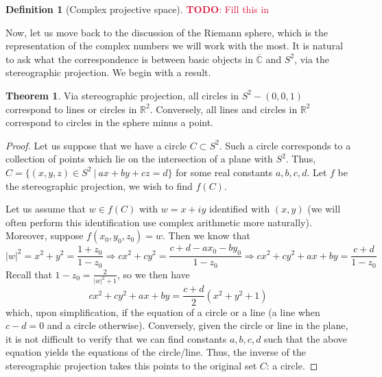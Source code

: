 \documentclass[aps,pra,showpacs,notitlepage,onecolumn,superscriptaddress,nofootinbib]{revtex4-1}
\newcommand{\pop}[1]{\textcolor{crimson}{#1}}
\theoremstyle{definition}
\newtheorem{definition}{Definition}[section]
\newtheorem{theorem}{Theorem}[section]
\begin{document}
\begin{definition}[Complex projective space]
  \pop{\textbf{TODO}: Fill this in}
\end{definition}

\noindent Now, let us move back to the discussion of the Riemann sphere, which is the representation of the complex numbers we will work with the most. It is natural
to ask what the correspondence is between basic objects in $\overline{\mathbb{C}}$ and $S^2$, via the stereographic projection. We begin with a result.

\begin{theorem}
  Via stereographic projection, all circles in $S^2 - (0, 0, 1)$ correspond to lines or circles in $\mathbb{R}^2$. Conversely, all lines and
  circles in $\mathbb{R}^2$ correspond to circles in the sphere minus a point.
\end{theorem}

\begin{proof}
  Let us suppose that we have a circle $C \subset S^2$. Such a circle corresponds to a collection of points which lie on the intersection of a plane with $S^2$. Thus, $C = \{(x, y, z) \in S^2 \ | \ ax + by + cz = d\}$
  for some real constants $a, b, c, d$. Let $f$ be the stereographic projection, we wish to find $f(C)$.

  Let us assume that $w \in f(C)$ with $w = x + iy$ identified with $(x, y)$ (we will often perform this identification use complex arithmetic more naturally). Moreover, suppose $f(x_0, y_0, z_0) = w$. Then we know that
  \begin{equation}
    |w|^2 = x^2 + y^2 = \frac{1 + z_0}{1 - z_0} \Longrightarrow cx^2 + cy^2 = \frac{c + d - ax_0 - by_0}{1 - z_0} \Longrightarrow cx^2 + cy^2 + ax + by = \frac{c + d}{1 - z_0}
  \end{equation}
  Recall that $1 - z_0 = \frac{2}{|w|^2 + 1}$, so we then have
  \begin{equation}
    cx^2 + cy^2 + ax + by = \frac{c + d}{2} (x^2 + y^2 + 1)
  \end{equation}
  which, upon simplification, if the equation of a circle or a line (a line when $c - d = 0$ and a circle otherwise). Conversely, given the circle or line in the plane, it is not difficult to verify that
  we can find constants $a, b, c, d$ such that the above equation yields the equations of the circle/line. Thus, the inverse of the stereographic projection takes this points to the original set $C$: a circle.
\end{proof}
\end{document}
